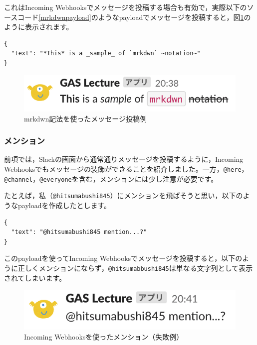 \documentclass[uplatex,a4j]{jsarticle}
\begin{document}
これはIncoming Webhooksでメッセージを投稿する場合も有効で，実際以下のソースコード\ref{mrkdwnpayload}のようなpayloadでメッセージを投稿すると，図\ref{fig:mrkdwn_payload1}のように表示されます。

\begin{lstlisting}[basicstyle=\ttfamily\footnotesize,frame=single,caption=mrkdwn payload sample,label=mrkdwnpayload]
{
  "text": "*This* is a _sample_ of `mrkdwn` ~notation~"
}
\end{lstlisting}

\begin{figure}[H]
 \centering
 \includegraphics[keepaspectratio, scale=0.8]{images/mrkdwn_payload1.png}
 \caption{mrkdwn記法を使ったメッセージ投稿例}
 \label{fig:mrkdwn_payload1}
\end{figure}


\subsubsection{メンション}

前項では，Slackの画面から通常通りメッセージを投稿するように，Incoming Webhooksでもメッセージの装飾ができることを紹介しました。一方，\verb|@here|，\verb|@channel|，\verb|@everyone|を含む，メンションには少し注意が必要です。


たとえば，私（\verb|@hitsumabushi845|）にメンションを飛ばそうと思い，以下のようなpayloadを作成したとします。

\begin{lstlisting}[basicstyle=\ttfamily\footnotesize,frame=single,caption=mention payload sample1,label=mrkdwnpayload]
{
  "text": "@hitsumabushi845 mention...?"
}
\end{lstlisting}

このpayloadを使ってIncoming Webhooksでメッセージを投稿すると，以下のように正しくメンションにならず，\verb|@hitsumabbushi845|は単なる文字列として表示されてしまいます。

\begin{figure}[H]
 \centering
 \includegraphics[keepaspectratio, scale=0.8]{images/mention1.png}
 \caption{Incoming Webhooksを使ったメンション（失敗例）}
 \label{fig:mention1}
\end{figure}
\end{document}
